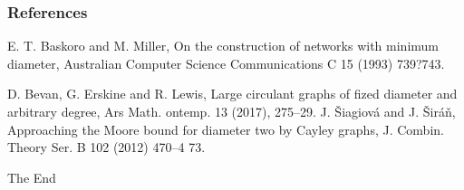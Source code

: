 \documentclass{beamer}
\begin{document}
\begin{frame}
	\frametitle{References}
    \footnotesize{
    	\begin{thebibliography}{99} %
			 E. T. Baskoro and M. Miller, On the construction of networks with minimum diameter,
				Australian Computer Science Communications C 15 (1993) 739?743.

			 D. Bevan, G. Erskine and R. Lewis, Large circulant graphs of fized diameter and arbitrary degree, Ars Math. ontemp. 13 (2017), 275--29.
			 J. \v{S}iagiov\'a and J. \v{S}ir\'a\v{n}, Approaching the Moore bound for diameter two by Cayley graphs, J. Combin. Theory Ser. B 102 (2012) 470--4    73.
        \end{thebibliography}
    }
\end{frame}
\begin{frame}
\Huge{\centerline{The End}}
\end{frame}
\end{document}
